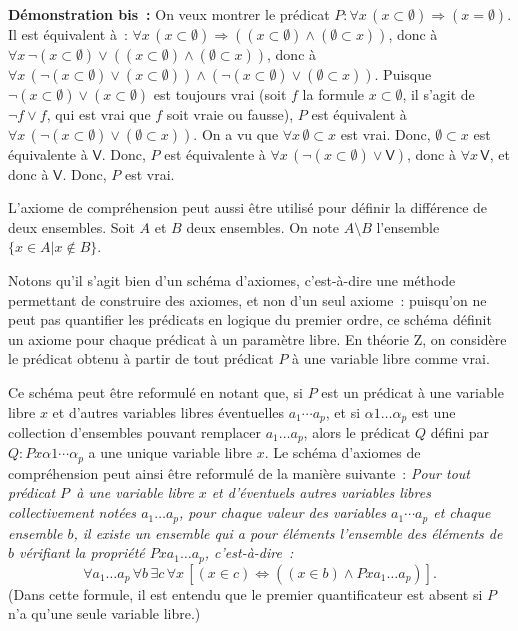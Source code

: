 \noindent\textbf{Démonstration bis :} 
    On veux montrer le prédicat $P: \forall x \, (x \subset \emptyset) \Rightarrow (x = \emptyset)$.
    Il est équivalent à : $\forall x \, (x \subset \emptyset) \Rightarrow ((x \subset \emptyset) \wedge (\emptyset \subset x))$, donc à $\forall x \, \neg (x \subset \emptyset) \vee ((x \subset \emptyset) \wedge (\emptyset \subset x))$, donc à $\forall x \, (\neg (x \subset \emptyset) \vee (x \subset \emptyset)) \wedge (\neg (x \subset \emptyset) \vee (\emptyset \subset x))$.
    Puisque $\neg (x \subset \emptyset) \vee (x \subset \emptyset)$ est toujours vrai (soit $f$ la formule $x \subset \emptyset$, il s'agit de $\neg f \vee f$, qui est vrai que $f$ soit vraie ou fausse), $P$ est équivalent à $\forall x \, (\neg (x \subset \emptyset) \vee (\emptyset \subset x))$.
    On a vu que $\forall x \, \emptyset \subset x$ est vrai.
    Donc, $\emptyset \subset x$ est équivalente à $\mathsf{V}$.
    Donc, $P$ est équivalente à $\forall x \, (\neg (x \subset \emptyset) \vee \mathsf{V})$, donc à $\forall x \, \mathsf{V}$, et donc à $\mathsf{V}$.
    Donc, $P$ est vrai.

    \done

\medskip

L'axiome de compréhension peut aussi être utilisé pour définir la différence de deux ensembles. 
Soit $A$ et $B$ deux ensembles. 
On note $A \setminus B$ l'ensemble $\lbrace x \in A \vert x \notin B \rbrace$.

\medskip

Notons qu'il s'agit bien d'un schéma d'axiomes, c'est-à-dire une méthode permettant de construire des axiomes, et non d'un seul axiome : puisqu'on ne peut pas quantifier les prédicats en logique du premier ordre, ce schéma définit un axiome pour chaque prédicat à un paramètre libre. 
En théorie Z, on considère le prédicat obtenu à partir de tout prédicat $P$ à une variable libre comme vrai.

Ce schéma peut être reformulé en notant que, si $P$ est un prédicat à une variable libre $x$ et d'autres variables libres éventuelles $a_1 \cdots a_p$, et si $\alpha 1 \dots \alpha_p$ est une collection d'ensembles pouvant remplacer $a_1 \dots a_p$, alors le prédicat $Q$ défini par $Q: P x \alpha1 \cdots \alpha_p$ a une unique variable libre $x$. 
Le schéma d'axiomes de compréhension peut ainsi être reformulé de la manière suivante : 
\textit{Pour tout prédicat $P$ à une variable libre $x$ et d'éventuels autres variables libres collectivement notées $a_1 \dots a_p$, pour chaque valeur des variables $a_1 \cdots a_p$ et chaque ensemble $b$, il existe un ensemble qui a pour éléments l'ensemble des éléments de $b$ vérifiant la propriété $P x a_1 \dots a_p$, c'est-à-dire :}
\begin{equation*}
\forall a_1 \dots a_p \, \forall b \, \exists c \, \forall x \, [ (x \in c) \Leftrightarrow ((x \in b) \wedge P x a_1 \dots a_p)]. 
\end{equation*}
(Dans cette formule, il est entendu que le premier quantificateur est absent si $P$ n'a qu'une seule variable libre.) 

